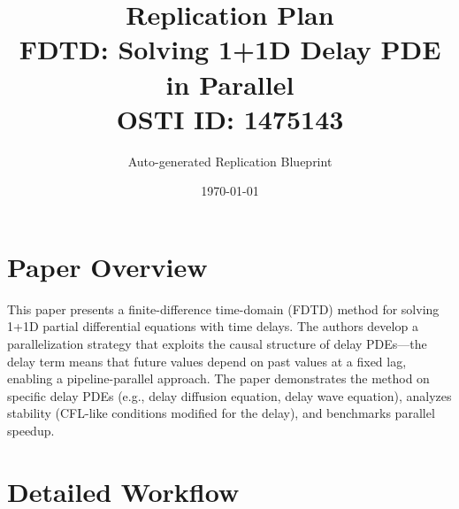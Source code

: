 \documentclass[11pt,a4paper]{article}
\title{\textbf{Replication Plan}\\[0.5em]
\large FDTD: Solving 1+1D Delay PDE in Parallel\\[0.3em]
\normalsize OSTI ID: 1475143}
\author{Auto-generated Replication Blueprint}
\date{\today}
\begin{document}
\maketitle
\tableofcontents
\newpage

\section{Paper Overview}
This paper presents a finite-difference time-domain (FDTD) method for solving 1+1D partial differential equations with time delays. The authors develop a parallelization strategy that exploits the causal structure of delay PDEs---the delay term means that future values depend on past values at a fixed lag, enabling a pipeline-parallel approach. The paper demonstrates the method on specific delay PDEs (e.g., delay diffusion equation, delay wave equation), analyzes stability (CFL-like conditions modified for the delay), and benchmarks parallel speedup.

\section{Detailed Workflow}
\end{document}
